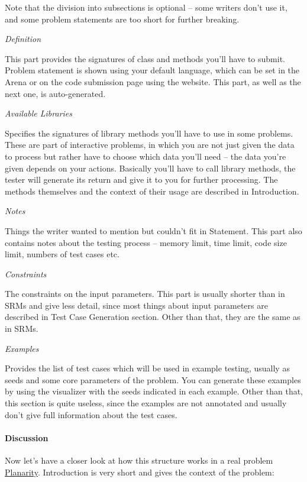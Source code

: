 \documentclass[]{article}
\let\oldparagraph\paragraph
\renewcommand{\paragraph}[1]{\oldparagraph{#1}\mbox{}}
\begin{document}
Note that the division into subsections is optional -- some writers
don't use it, and some problem statements are too short for further
breaking.

\emph{Definition}

This part provides the signatures of class and methods you'll have to
submit. Problem statement is shown using your default language, which
can be set in the Arena or on the code submission page using the
website. This part, as well as the next one, is auto-generated.

\emph{Available Libraries}

Specifies the signatures of library methods you'll have to use in some
problems. These are part of interactive problems, in which you are not
just given the data to process but rather have to choose which data
you'll need -- the data you're given depends on your actions. Basically
you'll have to call library methods, the tester will generate its return
and give it to you for further processing. The methods themselves and
the context of their usage are described in Introduction.

\emph{Notes}

Things the writer wanted to mention but couldn't fit in Statement. This
part also contains notes about the testing process -- memory limit, time
limit, code size limit, numbers of test cases etc.

\emph{Constraints}

The constraints on the input parameters. This part is usually shorter
than in SRMs and give less detail, since most things about input
parameters are described in Test Case Generation section. Other than
that, they are the same as in SRMs.

\emph{Examples}

Provides the list of test cases which will be used in example testing,
usually as seeds and some core parameters of the problem. You can
generate these examples by using the visualizer with the seeds indicated
in each example. Other than that, this section is quite useless, since
the examples are not annotated and usually don't give full information
about the test cases.

\hypertarget{discussion-1}{%
\paragraph{Discussion}\label{discussion-1}}

Now let's have a closer look at how this structure works in a real
problem
\href{http://community.topcoder.com/longcontest/?module=ViewProblemStatement\&rd=14272\&pm=10942}{Planarity}.
Introduction is very short and gives the context of the problem:
\end{document}
